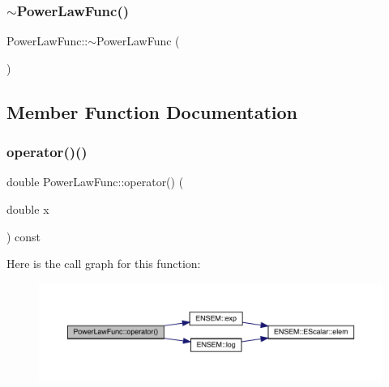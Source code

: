 \mbox{\label{classPowerLawFunc_a596daf259340179e1b3dc82e00569135}} 
\subsubsection{\texorpdfstring{$\sim$PowerLawFunc()}{~PowerLawFunc()}}
{\footnotesize\ttfamily Power\+Law\+Func\+::$\sim$\+Power\+Law\+Func (\begin{DoxyParamCaption}{ }\end{DoxyParamCaption})\hspace{0.3cm}{\ttfamily [inline]}}



\subsection{Member Function Documentation}
\mbox{\label{classPowerLawFunc_a39c1ca06f0f0f4b7874be6fe8c67f3e3}} 
\subsubsection{\texorpdfstring{operator()()}{operator()()}}
{\footnotesize\ttfamily double Power\+Law\+Func\+::operator() (\begin{DoxyParamCaption}\item[{double}]{x }\end{DoxyParamCaption}) const\hspace{0.3cm}{\ttfamily [inline]}}

Here is the call graph for this function\+:\nopagebreak
\begin{figure}[H]
\begin{center}
\leavevmode
\includegraphics[width=350pt]{d3/db8/classPowerLawFunc_a39c1ca06f0f0f4b7874be6fe8c67f3e3_cgraph}
\end{center}
\end{figure}
\mbox{\label{classPowerLawFunc_aa1eab94d7a8d404080ed25fde7dbd889}} 
